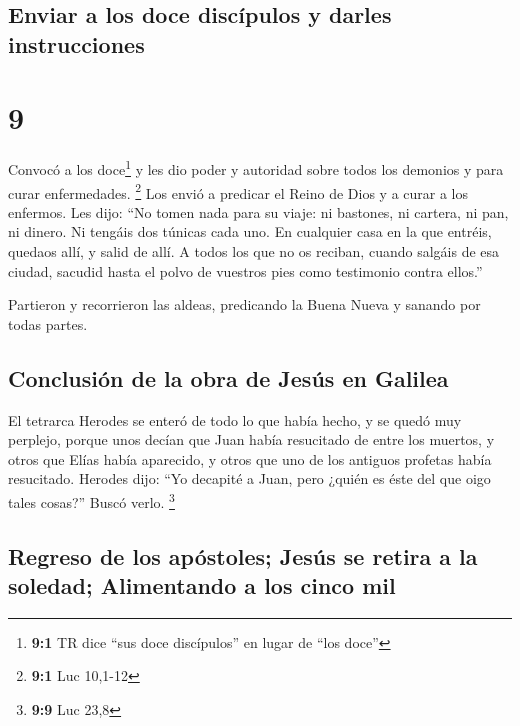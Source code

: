 \begin{paracol}{2}
{\subsection{Enviar a los doce discípulos y darles
instrucciones}\label{enviar-a-los-doce-discuxedpulos-y-darles-instrucciones}}

\hypertarget{section-16}{%
\section{9}\label{section-16}}

 Convocó a los doce\footnote{\textbf{9:1} TR dice ``sus
  doce discípulos'' en lugar de ``los doce''} y les dio poder y
autoridad sobre todos los demonios y para curar enfermedades.
\footnote{\textbf{9:1} Luc 10,1-12}  Los envió a predicar
el Reino de Dios y a curar a los enfermos.  Les dijo: ``No
tomen nada para su viaje: ni bastones, ni cartera, ni pan, ni dinero. Ni
tengáis dos túnicas cada uno.  En cualquier casa en la que
entréis, quedaos allí, y salid de allí.  A todos los que
no os reciban, cuando salgáis de esa ciudad, sacudid hasta el polvo de
vuestros pies como testimonio contra ellos.''

 Partieron y recorrieron las aldeas, predicando la Buena
Nueva y sanando por todas partes.

\hypertarget{conclusiuxf3n-de-la-obra-de-jesuxfas-en-galilea}{%
\subsection{Conclusión de la obra de Jesús en
Galilea}\label{conclusiuxf3n-de-la-obra-de-jesuxfas-en-galilea}}

 El tetrarca Herodes se enteró de todo lo que había hecho,
y se quedó muy perplejo, porque unos decían que Juan había resucitado de
entre los muertos,  y otros que Elías había aparecido, y
otros que uno de los antiguos profetas había resucitado. 
Herodes dijo: ``Yo decapité a Juan, pero ¿quién es éste del que oigo
tales cosas?'' Buscó verlo. \footnote{\textbf{9:9} Luc 23,8}

\hypertarget{regreso-de-los-apuxf3stoles-jesuxfas-se-retira-a-la-soledad-alimentando-a-los-cinco-mil}{%
\subsection{Regreso de los apóstoles; Jesús se retira a la soledad;
Alimentando a los cinco
mil}\label{regreso-de-los-apuxf3stoles-jesuxfas-se-retira-a-la-soledad-alimentando-a-los-cinco-mil}}


\end{paracol}
